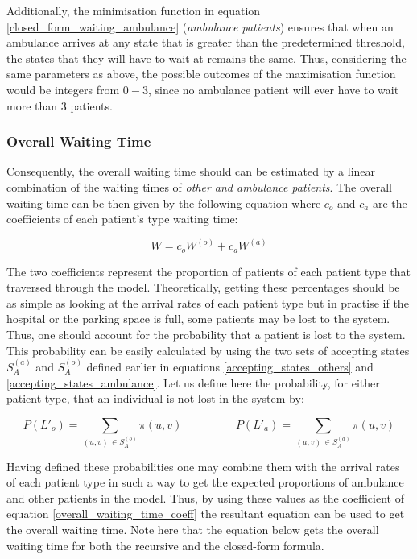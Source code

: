 Additionally, the minimisation function in equation \ref{closed_form_waiting_ambulance} (\textit{ambulance patients}) ensures that when an ambulance arrives at any state that is greater than the predetermined threshold, the states that they will have to wait at remains the same. Thus, considering the same parameters as above, the possible outcomes of the maximisation function would be integers from \( 0 - 3 \), since no ambulance patient will ever have to wait more than \(3\) patients.



\subsubsection{Overall Waiting Time}

Consequently, the overall waiting time should can be estimated by a linear combination of the waiting times of \textit{other and ambulance patients}. The overall waiting time can be then given by the following equation where \(c_o\) and \(c_a\) are the coefficients of each patient's type waiting time:

\begin{equation}\label{overall_waiting_time_coeff}
    W = c_o W^{(o)} + c_a W^{(a)}
\end{equation}

The two coefficients represent the proportion of patients of each patient type that traversed through the model. Theoretically, getting these percentages should be as simple as looking at the arrival rates of each patient type but in practise if the hospital or the parking space is full, some patients may be lost to the system. Thus, one should account for the probability that a patient is lost to the system. This probability can be easily calculated by using the two sets of accepting states \(S_A^{(a)}\) and \(S_A^{(o)}\) defined earlier in equations \ref{accepting_states_others} and \ref{accepting_states_ambulance}. Let us define here the probability, for either patient type, that an individual is not lost in the system by:

\begin{equation*}
    P(L'_o) = \sum_{(u,v) \, \in S_A^{(o)}} \pi(u,v) \hspace{2cm}
    P(L'_a) = \sum_{(u,v) \, \in S_A^{(a)}} \pi(u,v)
\end{equation*}

Having defined these probabilities one may combine them with the arrival rates of each patient type in such a way to get the expected proportions of ambulance and other patients in the model. Thus, by using these values as the coefficient of equation \ref{overall_waiting_time_coeff} the resultant equation can be used to get the overall waiting time. Note here that the equation below gets the overall waiting time for both the recursive and the closed-form formula.

